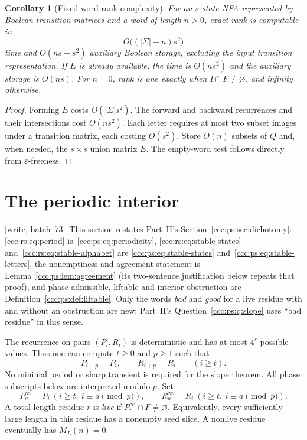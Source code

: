 \documentclass[11pt,letterpaper]{article}
\newtheorem{corollary}[theorem]{Corollary}
\theoremstyle{definition}
\theoremstyle{remark}
\newcommand{\eps}{\varepsilon}
\newcommand{\wsevthree}{\textup{[write, batch~73]}}
\begin{document}
\begin{corollary}[Fixed word rank complexity]\label{ccc:rs:cor:algorithm}
For an $s$-state NFA represented by Boolean transition matrices and a word of length $n>0$, exact rank is computable in
\[
O\bigl((|\Sigma|+n)s^2\bigr)
\]
time and $O(ns+s^2)$ auxiliary Boolean storage, excluding the input transition representation. If $E$ is already available, the time is $O(ns^2)$ and the auxiliary storage is $O(ns)$. For $n=0$, rank is one exactly when $I\cap F\ne\varnothing$, and infinity otherwise.
\end{corollary}
\begin{proof}
Forming $E$ costs $O(|\Sigma|s^2)$. The forward and backward recurrences and their intersections cost $O(ns^2)$. Each letter requires at most two subset images under a transition matrix, each costing $O(s^2)$. Store $O(n)$ subsets of $Q$ and, when needed, the $s\times s$ union matrix $E$. The empty-word test follows directly from $\eps$-freeness.
\end{proof}

\section{The periodic interior}\label{ccc:rs:sec:periodic}

\wsevthree\ This section restates Part~II's Section~\ref{ccc:ps:sec:dichotomy}:
\eqref{ccc:rs:eq:period} is~\eqref{ccc:ps:eq:periodicity},
\eqref{ccc:rs:eq:stable-states} and~\eqref{ccc:rs:eq:stable-alphabet} are
\eqref{ccc:ps:eq:stable-states} and~\eqref{ccc:ps:eq:stable-letters}, the
nonemptiness and agreement statement is Lemma~\ref{ccc:ps:lem:agreement}
(its two-sentence justification below repeats that proof), and
phase-admissible, liftable and interior obstruction are
Definition~\ref{ccc:ps:def:liftable}. Only the words \emph{bad} and
\emph{good} for a live residue with and without an obstruction are new;
Part~II's Question~\ref{ccc:ps:q:slope} uses ``bad residue'' in this sense.

The recurrence on pairs $(P_i,R_i)$ is deterministic and has at most $4^s$ possible values. Thus one can compute $t\ge0$ and $p\ge1$ such that
\begin{equation}\label{ccc:rs:eq:period}
P_{i+p}=P_i,\qquad R_{i+p}=R_i\qquad(i\ge t).
\end{equation}
No minimal period or sharp transient is required for the slope theorem. All phase subscripts below are interpreted modulo $p$. Set
\[
P^\infty_a=P_i\ (i\ge t,\ i\equiv a\pmod p),\qquad
R^\infty_a=R_i\ (i\ge t,\ i\equiv a\pmod p).
\]
A total-length residue $r$ is \emph{live} if $P^\infty_r\cap F\ne\varnothing$. Equivalently, every sufficiently large length in this residue has a nonempty seed slice. A nonlive residue eventually has $M_L(n)=0$.
\end{document}
